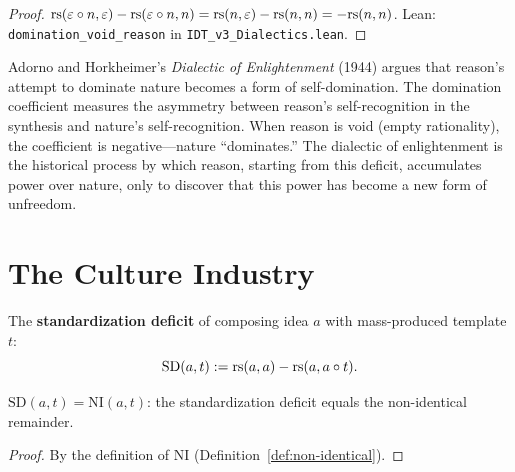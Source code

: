 \begin{proof}
$\mathrm{rs}(\varepsilon \circ n, \varepsilon) - \mathrm{rs}(\varepsilon \circ n, n) = \mathrm{rs}(n, \varepsilon) - \mathrm{rs}(n,n) = -\mathrm{rs}(n,n)$.
Lean: \texttt{domination\_void\_reason} in \texttt{IDT\_v3\_Dialectics.lean}.
\end{proof}

\begin{interpretation}
Adorno and Horkheimer's \textit{Dialectic of Enlightenment} (1944) argues that
reason's attempt to dominate nature becomes a form of self-domination. The
domination coefficient measures the asymmetry between reason's self-recognition
in the synthesis and nature's self-recognition. When reason is void (empty
rationality), the coefficient is negative---nature ``dominates.'' The
dialectic of enlightenment is the historical process by which reason, starting
from this deficit, accumulates power over nature, only to discover that this
power has become a new form of unfreedom.
\end{interpretation}

\section{The Culture Industry}

\begin{definition}
\label{def:standardization}
The \textbf{standardization deficit} of composing idea $a$ with mass-produced
template $t$:
\[
\mathrm{SD}(a, t) := \mathrm{rs}(a, a) - \mathrm{rs}(a, a \circ t).
\]
\end{definition}

\begin{theorem}
\label{thm:standardization-nonneg}
$\mathrm{SD}(a, t) = \mathrm{NI}(a, t)$: the standardization deficit equals
the non-identical remainder.
\end{theorem}

\begin{proof}
By the definition of $\mathrm{NI}$ (Definition~\ref{def:non-identical}).
\end{proof}

